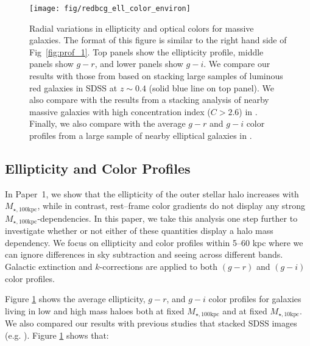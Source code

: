 \documentclass[a4paper,fleqn,usenatbib]{mnras}
\def\minn{{$M_{\star,10\mathrm{kpc}}$}}
\def\mtot{{$M_{\star,100\mathrm{kpc}}$}}
\begin{document}
  \begin{figure}
      \centering 
      \texttt{[image: fig/redbcg\_ell\_color\_environ]}
      \caption{
          Radial variations in ellipticity and optical colors for massive galaxies. 
          The format of this figure is similar to the right hand side of 
          Fig~\ref{fig:prof_1}. 
          Top panels show the ellipticity profile, middle panels show $g-r$, and lower 
          panels show $g-i$. 
          We compare our results with those from \citet{Tal2011} based on stacking 
          large samples of luminous red galaxies in SDSS at $z{\sim} 0.4$ 
          (solid blue line on top panel). 
          We also compare with the results from a stacking analysis of nearby massive 
          galaxies with high concentration index ($C>2.6$) in 
          \citet[][blue dash lines on the top and middle panels]{DSouza2014}. 
          Finally, we also compare with the average $g-r$ and $g-i$ color profiles 
          from a large sample of nearby elliptical galaxies in \citet[][blue, solid 
          lines on the middle and bottom panels]{LaBarbera2010}.
          }
      \label{fig:ell_color}
  \end{figure}


\subsection{Ellipticity and Color Profiles}
    \label{ssec:ell_color}
    
    In Paper~1, we show that the ellipticity of the outer stellar halo increases with \mtot{}, while in contrast, rest--frame color gradients do not display any strong \mtot{}-dependencies. In this paper, we take this analysis one step further to investigate whether or not either of these quantities display a halo mass dependency. We focus on ellipticity and color profiles within 5--60 kpc where we can ignore differences in sky subtraction and seeing across different bands. Galactic extinction and $k$-corrections are applied to both $(g-r)$ and $(g-i)$ color profiles.
    
    Figure \ref{fig:ell_color} shows the average ellipticity, $g-r$, and $g-i$ color profiles for galaxies living in low and high mass haloes both at fixed \mtot{} and at fixed \minn{}. We also compared our results with previous studies that stacked SDSS images (e.g. \citealt{LaBarbera2010, Tal2011, DSouza2014}). Figure \ref{fig:ell_color} shows that: 
    
\end{document}
